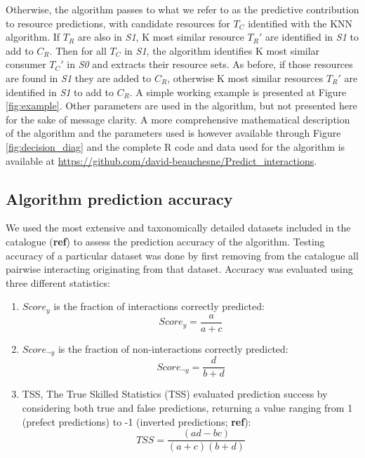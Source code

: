 \documentclass[letterpaper]{article}
\begin{document}
Otherwise, the algorithm passes to what we refer to as the predictive contribution to resource predictions, with candidate resources for $T_C$ identified with the KNN algorithm. If $T_R$ are also in \textit{S1}, K most similar resource $T_R'$ are identified in \textit{S1} to add to $C_R$. Then for all $T_C$ in \textit{S1}, the algorithm identifies K most similar consumer $T_C'$ in \textit{S0} and extracts their resource sets. As before, if those resources are found in \textit{S1} they are added to $C_R$, otherwise K most similar resources $T_R'$ are identified in \textit{S1} to add to $C_R$. A simple working example is presented at Figure \ref{fig:example}. Other parameters are used in the algorithm, but not presented here for the sake of message clarity. A more comprehensive mathematical description of the algorithm and the parameters used is however available through Figure \ref{fig:decision_diag} and the complete R code and data used for the algorithm is available at \href{https://github.com/david-beauchesne/Predict_interactions}{https://github.com/david-beauchesne/Predict\_interactions}.


\subsection{Algorithm prediction accuracy}
We used the most extensive and taxonomically detailed datasets included in the catalogue (\textbf{ref}) to assess the prediction accuracy of the algorithm. Testing accuracy of a particular dataset was done by first removing from the catalogue all pairwise interacting originating from that dataset. Accuracy was evaluated using three different statistics:

\begin{enumerate}
 \item $Score_y$ is the fraction of interactions correctly predicted:
     \begin{equation}
         Score_y = \frac{a}{a + c}
     \end{equation}

 \item $Score_{\neg y}$ is the fraction of non-interactions correctly predicted:
     \begin{equation}
       Score_{\neg y}  = \frac{d}{b + d}
     \end{equation}

 \item TSS, The True Skilled Statistics (TSS) evaluated prediction success by considering both true and false predictions, returning a value ranging from 1 (prefect predictions) to -1 (inverted predictions; \textbf{ref}): %
     \begin{equation}
       TSS = \frac{(ad - bc)}{(a + c)(b + d)}
     \end{equation}
\end{enumerate}
\end{document}

